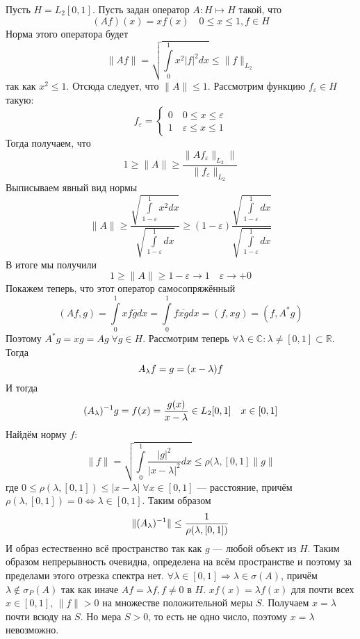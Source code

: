 \documentclass[14pt]{extarticle}
\begin{document}
\nopagebreak
\begin{Prim}
    Пусть $H = L_2[0,1]$.
    Пусть задан оператор $A : H \mapsto H$ такой, что
    $$
    (A f)(x) = x f(x) \quad 0 \le x \le 1, f \in H
    $$
    Норма этого оператора будет
    $$
    \|Af\| = \sqrt{\int\limits_0^1 x^2 |f|^2 dx} \le \|f\|_{L_2}
    $$
    так как $x^2 \le 1$.
    Отсюда следует, что $\|A\| \le 1$.
    Рассмотрим функцию $f_\varepsilon \in H$ такую:
    $$
    f_\varepsilon =
    \left\{
        \begin{aligned}
            0 \quad 0 \le x \le \varepsilon\\
            1 \quad \varepsilon \le x \le 1
        \end{aligned}
    \right.
    $$
    Тогда получаем, что
    $$
    1 \ge \|A\| \ge \dfrac{\|A f_\varepsilon\|_{L_2}\|}{\|f_\varepsilon\|
    _{L_2}}
    $$
    Выписываем явный вид нормы
    $$
    \|A\| \ge \dfrac{\sqrt{\int\limits_{1 - \varepsilon}^1 x^2 dx}}{\sqrt{\int
    \limits_{1-\varepsilon}^1 dx}} \ge (1  - \varepsilon)
    \dfrac{\sqrt{\int\limits_{1 - \varepsilon}^1 dx}}{\sqrt{\int\limits_{1 - 
    \varepsilon}^1 dx}}
    $$
    В итоге мы получили
    $$
    1 \ge \|A\| \ge 1 - \varepsilon \to 1 \quad \varepsilon \to +0
    $$
    Покажем теперь, что этот оператор самосопряжённый
    $$
    (Af, g) = \int\limits_0^1 x f \overline{g} dx = \int \limits_0^1 f 
    \overline{xg} dx = (f, xg) = (f, A^*g)
    $$
    Поэтому $A^*g = xg =Ag\; \forall g \in H$.
    Рассмотрим теперь $\forall \lambda \in \mathbb C\colon \lambda \ne [0,1] 
    \subset \mathbb R$.
    Тогда
    $$
    A_\lambda f = g = (x - \lambda)f
    $$
    И тогда
    $$
    (A_\lambda)^{-1} g = f(x) = \dfrac{g(x)}{x -\lambda} \in L_2[0,1] \quad x \in [0,1]
    $$
    Найдём норму $f$:
    $$
    \|f\| = \sqrt{\int \limits_0^1 \dfrac{|g|^2}{|x - \lambda|^2}dx} \le 
    \rho(\lambda, [0,1] \|g\|
    $$
    где $0 \le \rho(\lambda, [0, 1]) \le |x - \lambda|\; \forall x \in [0, 1]$ 
    --- расстояние, причём $\rho(\lambda, [0, 1]) = 0 
    \Leftrightarrow \lambda \in [0,1]$.
    Таким образом 
    $$
    \|(A_\lambda)^{-1}\| \le \dfrac{1}{\rho(\lambda, [0, 1])}
    $$
    И образ естественно всё пространство так как $g$ --- любой объект из $H$.
    Таким образом непрерывность очевидна, определена на всём пространстве и 
    поэтому за пределами этого отрезка спектра
    нет.
    $\forall \lambda \in [0,1] \Rightarrow \lambda \in \sigma(A)$, причём $
    \lambda \notin \sigma_P(A)$ так как иначе
    $Af = \lambda f, f \ne 0$ в $H$.
    $x f(x) = \lambda f(x)$ для почти всех $x \in [0,1]$, $\|f\| > 0$ на 
    множестве положительной меры $S$. 
    Получаем $x = \lambda$ почти всюду на $S$.
    Но мера $S > 0$, то есть не одно число, поэтому $x = \lambda$ невозможно.
    

\end{Prim}
\end{document}

